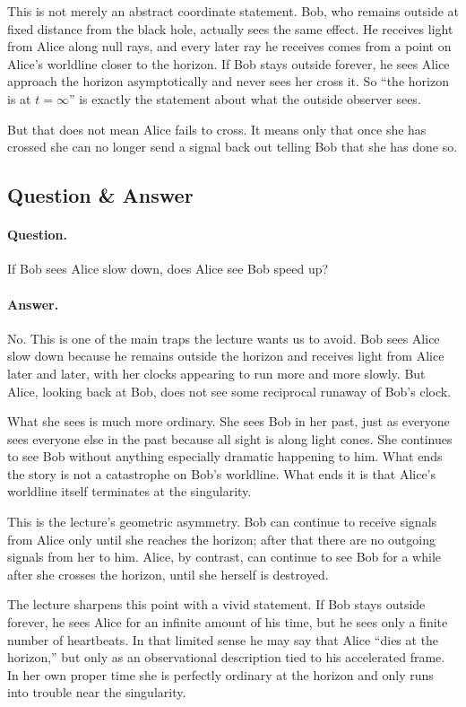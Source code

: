 This is not merely an abstract coordinate statement. Bob, who remains outside at fixed distance from the black hole, actually sees the same effect. He receives light from Alice along null rays, and every later ray he receives comes from a point on Alice's worldline closer to the horizon. If Bob stays outside forever, he sees Alice approach the horizon asymptotically and never sees her cross it. So ``the horizon is at \(t=\infty\)'' is exactly the statement about what the outside observer sees.

But that does not mean Alice fails to cross. It means only that once she has crossed she can no longer send a signal back out telling Bob that she has done so.

\subsection{Question \& Answer}

\paragraph{Question.} If Bob sees Alice slow down, does Alice see Bob speed up?

\paragraph{Answer.} No. This is one of the main traps the lecture wants us to avoid. Bob sees Alice slow down because he remains outside the horizon and receives light from Alice later and later, with her clocks appearing to run more and more slowly. But Alice, looking back at Bob, does not see some reciprocal runaway of Bob's clock.

What she sees is much more ordinary. She sees Bob in her past, just as everyone sees everyone else in the past because all sight is along light cones. She continues to see Bob without anything especially dramatic happening to him. What ends the story is not a catastrophe on Bob's worldline. What ends it is that Alice's worldline itself terminates at the singularity.

This is the lecture's geometric asymmetry. Bob can continue to receive signals from Alice only until she reaches the horizon; after that there are no outgoing signals from her to him. Alice, by contrast, can continue to see Bob for a while after she crosses the horizon, until she herself is destroyed.

The lecture sharpens this point with a vivid statement. If Bob stays outside forever, he sees Alice for an infinite amount of his time, but he sees only a finite number of heartbeats. In that limited sense he may say that Alice ``dies at the horizon,'' but only as an observational description tied to his accelerated frame. In her own proper time she is perfectly ordinary at the horizon and only runs into trouble near the singularity.

